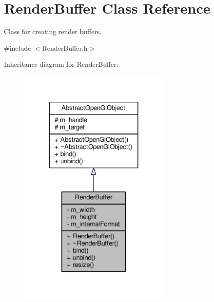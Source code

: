 \hypertarget{class_render_buffer}{\section{Render\-Buffer Class Reference}
\label{class_render_buffer}
}


Class for creating render buffers.  




{\ttfamily \#include $<$Render\-Buffer.\-h$>$}



Inheritance diagram for Render\-Buffer\-:\nopagebreak
\begin{figure}[H]
\begin{center}
\leavevmode
\includegraphics[width=216pt]{class_render_buffer__inherit__graph}
\end{center}
\end{figure}


